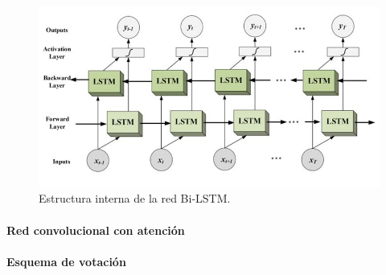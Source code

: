 \begin{figure}[H]
	\centering
	\includegraphics[width=14cm]{Graphics/bi_lstm.jpg}
	\caption{Estructura interna de la red Bi-LSTM\cite{bilstm_image}.}
	\label{fig:bi_lstm}
\end{figure}

\paragraph{Red convolucional con atención}


\paragraph{Esquema de votación}
